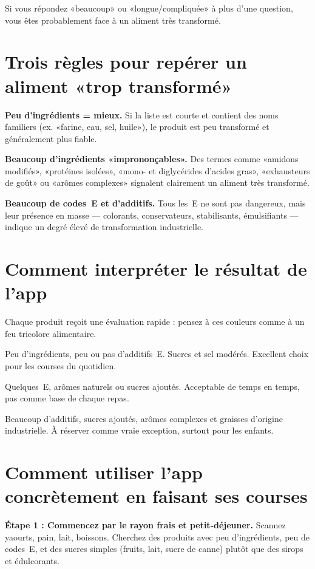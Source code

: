 \documentclass[a5paper,12pt,oneside,openany]{book}
\newcommand{\boxvert}[2]{%
  \begin{tcolorbox}[boitebase,
    colback=verdescuro!8!white, colframe=verdescuro, title={#1}]
  #2\end{tcolorbox}}
\newcommand{\boxjaune}[2]{%
  \begin{tcolorbox}[boitebase,
    colback=jaune!12!white, colframe=jaune!80!black, title={#1}]
  #2\end{tcolorbox}}
\newcommand{\boxrouge}[2]{%
  \begin{tcolorbox}[boitebase,
    colback=rouge!8!white, colframe=rouge, title={#1}]
  #2\end{tcolorbox}}
\begin{document}
Si vous répondez «beaucoup» ou «longue/compliquée» à plus d'une question, vous
êtes probablement face à un aliment très transformé.

\section{Trois règles pour repérer un aliment «trop transformé»}

\textbf{Peu d'ingrédients = mieux.} Si la liste est courte et contient des noms
familiers (ex. «farine, eau, sel, huile»), le produit est peu transformé et
généralement plus fiable.

\textbf{Beaucoup d'ingrédients «imprononçables».} Des termes comme «amidons
modifiés», «protéines isolées», «mono- et diglycérides d'acides gras»,
«exhausteurs de goût» ou «arômes complexes» signalent clairement un aliment
très transformé.

\textbf{Beaucoup de codes~E et d'additifs.} Tous les~E ne sont pas dangereux,
mais leur présence en masse --- colorants, conservateurs, stabilisants,
émulsifiants --- indique un degré élevé de transformation industrielle.

\section{Comment interpréter le résultat de l'app}

Chaque produit reçoit une évaluation rapide : pensez à ces couleurs comme à
un feu tricolore alimentaire.

\boxvert{Peu transformé --- feu vert}{Peu d'ingrédients, peu ou pas d'additifs~E.
Sucres et sel modérés. Excellent choix pour les courses du quotidien.}

\boxjaune{Modérément transformé --- avec modération}{Quelques~E, arômes naturels
ou sucres ajoutés. Acceptable de temps en temps, pas comme base de chaque repas.}

\boxrouge{Ultra-transformé --- à limiter ou éviter}{Beaucoup d'additifs, sucres
ajoutés, arômes complexes et graisses d'origine industrielle. À réserver comme
vraie exception, surtout pour les enfants.}

\section{Comment utiliser l'app concrètement en faisant ses courses}

\textbf{Étape 1 : Commencez par le rayon frais et petit-déjeuner.} Scannez
yaourts, pain, lait, boissons. Cherchez des produits avec peu d'ingrédients,
peu de codes~E, et des sucres simples (fruits, lait, sucre de canne) plutôt que
des sirops et édulcorants.
\end{document}
